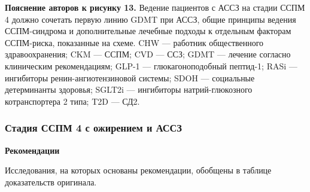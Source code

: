 \documentclass[11pt,a4paper]{article}
\newcommand{\heading}[1]{\par\medskip\textbf{#1}\par}
\begin{document}
\textbf{Пояснение авторов к рисунку 13.} Ведение пациентов с АССЗ на стадии ССПМ 4 должно сочетать первую линию GDMT при АССЗ, общие принципы ведения ССПМ-синдрома и дополнительные лечебные подходы к отдельным факторам ССПМ-риска, показанные на схеме. CHW --- работник общественного здравоохранения; CKM --- ССПМ; CVD --- ССЗ; GDMT --- лечение согласно клиническим рекомендациям; GLP-1 --- глюкагоноподобный пептид-1; RASi --- ингибиторы ренин-ангиотензиновой системы; SDOH --- социальные детерминанты здоровья; SGLT2i --- ингибиторы натрий-глюкозного котранспортера 2 типа; T2D --- СД2.

\subsubsection{Стадия ССПМ 4 с ожирением и АССЗ}
\heading{Рекомендации}
Исследования, на которых основаны рекомендации, обобщены в таблице доказательств оригинала.
\end{document}
